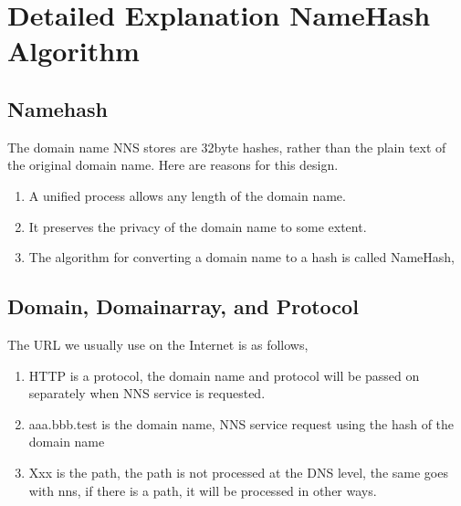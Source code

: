 \documentclass[letterpaper,10pt,english]{sphinxmanual}
\begin{document}
\section{Detailed Explanation NameHash Algorithm}
\label{\detokenize{nns_protocol:namehash}}\label{\detokenize{nns_protocol:detailed-explanation-namehash-algorithm}}

\subsection{Namehash}
\label{\detokenize{nns_protocol:id1}}
The domain name NNS stores are 32byte hashes, rather than the plain text of the original domain name. Here are reasons for this design.
\begin{enumerate}
\item {} 
A unified process allows any length of the domain name.

\item {} 
It preserves the privacy of the domain name to some extent.

\item {} 
The algorithm for converting a domain name to a hash is called NameHash,

\end{enumerate}


\subsection{Domain, Domainarray, and Protocol}
\label{\detokenize{nns_protocol:domain-domainarray-and-protocol}}
The URL we usually use on the Internet is as follows,

%
\begin{sphinxVerbatim}[commandchars=\\\{\}]
\end{sphinxVerbatim}
\begin{enumerate}
\item {} 
HTTP is a protocol, the domain name and protocol will be passed on separately when NNS service is requested.

\item {} 
aaa.bbb.test is the domain name, NNS service request using the hash of the domain name

\item {} 
Xxx is the path, the path is not processed at the DNS level, the same goes with nns, if there is a path, it will be processed in other ways.

\end{enumerate}
\end{document}
